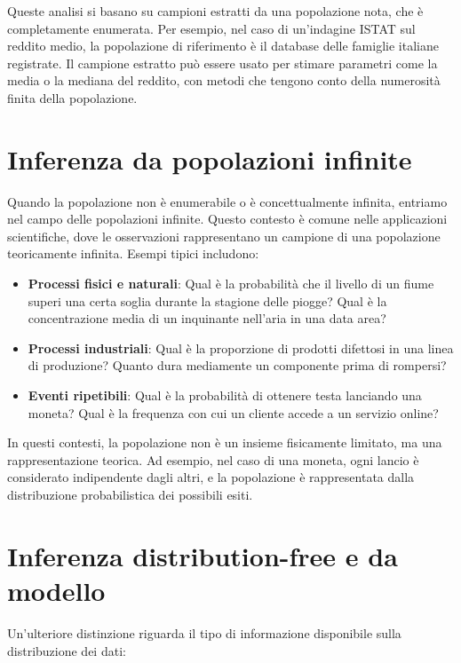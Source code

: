 \documentclass[
  11pt,
]{book}
\providecommand{\tightlist}{%
  \setlength{\itemsep}{0pt}\setlength{\parskip}{0pt}}
\theoremstyle{mytheoremstyle}
\theoremstyle{mydefstyle}
\begin{document}
Queste analisi si basano su campioni estratti da una popolazione nota, che è completamente enumerata. Per esempio, nel caso di un'indagine ISTAT sul reddito medio, la popolazione di riferimento è il database delle famiglie italiane registrate. Il campione estratto può essere usato per stimare parametri come la media o la mediana del reddito, con metodi che tengono conto della numerosità finita della popolazione.

\section{Inferenza da popolazioni infinite}\label{inferenza-da-popolazioni-infinite}

Quando la popolazione non è enumerabile o è concettualmente infinita, entriamo nel campo delle popolazioni infinite. Questo contesto è comune nelle applicazioni scientifiche, dove le osservazioni rappresentano un campione di una popolazione teoricamente infinita. Esempi tipici includono:

\begin{itemize}
\tightlist
\item
  \textbf{Processi fisici e naturali}: Qual è la probabilità che il livello di un fiume superi una certa soglia durante la stagione delle piogge? Qual è la concentrazione media di un inquinante nell'aria in una data area?
\item
  \textbf{Processi industriali}: Qual è la proporzione di prodotti difettosi in una linea di produzione? Quanto dura mediamente un componente prima di rompersi?
\item
  \textbf{Eventi ripetibili}: Qual è la probabilità di ottenere testa lanciando una moneta? Qual è la frequenza con cui un cliente accede a un servizio online?
\end{itemize}

In questi contesti, la popolazione non è un insieme fisicamente limitato, ma una rappresentazione teorica. Ad esempio, nel caso di una moneta, ogni lancio è considerato indipendente dagli altri, e la popolazione è rappresentata dalla distribuzione probabilistica dei possibili esiti.

\section{Inferenza distribution-free e da modello}\label{inferenza-distribution-free-e-da-modello}

Un'ulteriore distinzione riguarda il tipo di informazione disponibile sulla distribuzione dei dati:
\end{document}
